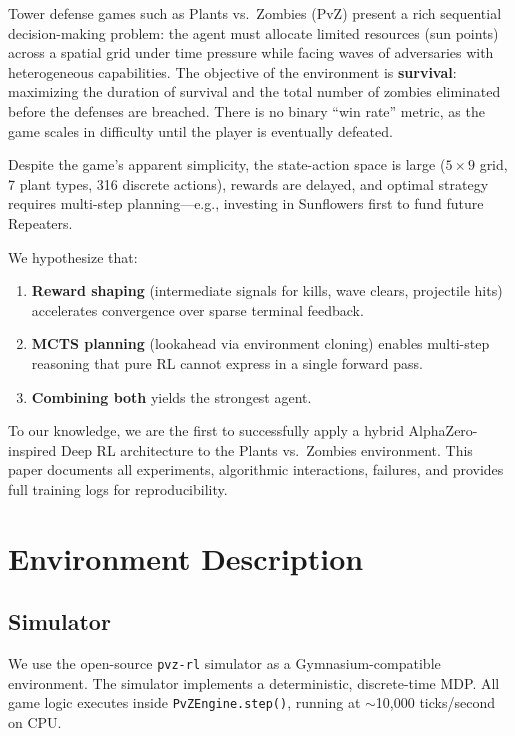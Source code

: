 \documentclass[conference]{IEEEtran}
\begin{document}
Tower defense games such as Plants vs.\ Zombies (PvZ) present a rich sequential decision-making problem: the agent must allocate limited resources (sun points) across a spatial grid under time pressure while facing waves of adversaries with heterogeneous capabilities. The objective of the environment is \textbf{survival}: maximizing the duration of survival and the total number of zombies eliminated before the defenses are breached. There is no binary ``win rate'' metric, as the game scales in difficulty until the player is eventually defeated.

Despite the game's apparent simplicity, the state-action space is large ($5 \times 9$ grid, 7 plant types, 316 discrete actions), rewards are delayed, and optimal strategy requires multi-step planning---e.g., investing in Sunflowers first to fund future Repeaters. 

We hypothesize that:
\begin{enumerate}[leftmargin=*]
    \item \textbf{Reward shaping} (intermediate signals for kills, wave clears, projectile hits) accelerates convergence over sparse terminal feedback.
    \item \textbf{MCTS planning} (lookahead via environment cloning) enables multi-step reasoning that pure RL cannot express in a single forward pass.
    \item \textbf{Combining both} yields the strongest agent.
\end{enumerate}

To our knowledge, we are the first to successfully apply a hybrid AlphaZero-inspired Deep RL architecture to the Plants vs.\ Zombies environment. This paper documents all experiments, algorithmic interactions, failures, and provides full training logs for reproducibility.

\section{Environment Description}

\subsection{Simulator}
We use the open-source \texttt{pvz-rl} simulator as a Gymnasium-compatible environment. The simulator implements a deterministic, discrete-time MDP. All game logic executes inside \texttt{PvZEngine.step()}, running at $\sim$10,000 ticks/second on CPU. 
\end{document}
